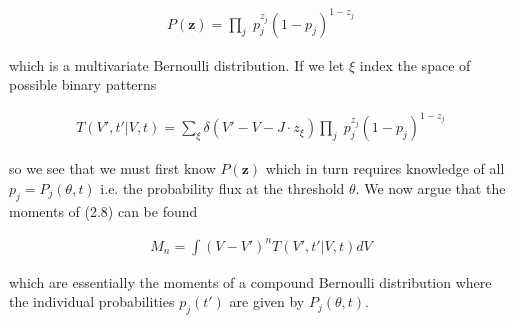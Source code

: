 \documentclass{ucetd}
\begin{document}
\begin{align*}
P(\mathbf{z}) = \underset{j}{\prod} \; p_{j}^{z_{j}}(1-p_{j})^{1-z_{j}}
\end{align*}

which is a multivariate Bernoulli distribution. If we let $\xi$ index the space of possible binary patterns

\begin{align}
T(V',t'|V,t) = \sum_{\xi} \delta(V'- V - J\cdot z_{\xi})\underset{j}{\prod} \; p_{j}^{z_{j}}(1-p_{j})^{1-z_{j}}
\end{align}

so we see that we must first know $P(\mathbf{z})$ which in turn requires knowledge of all $p_{j} = P_{j}(\theta, t)$ i.e. the probability flux at the threshold $\theta$. We now argue that the moments of (2.8) can be found 

\begin{align}
M_{n} = \int (V-V')^{n} T(V',t'|V,t) dV
\end{align}

which are essentially the moments of a compound Bernoulli distribution where the individual probabilities $p_{j}(t')$ are given by $P_{j}(\theta, t)$.
\end{document}

